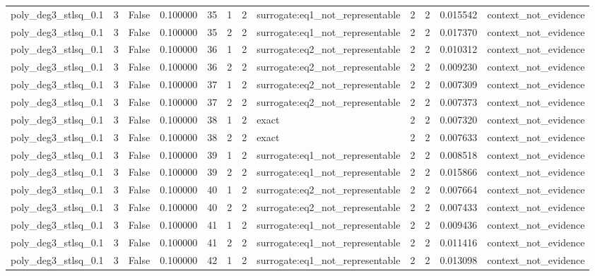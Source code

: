 \begin{tabular}{lrrrrrrlrrrl}
poly\_deg3\_stlsq\_0.1 & 3 & False & 0.100000 & 35 & 1 & 2 & surrogate:eq1\_not\_representable & 2 & 2 & 0.015542 & context\_not\_evidence \\
poly\_deg3\_stlsq\_0.1 & 3 & False & 0.100000 & 35 & 2 & 2 & surrogate:eq1\_not\_representable & 2 & 2 & 0.017370 & context\_not\_evidence \\
poly\_deg3\_stlsq\_0.1 & 3 & False & 0.100000 & 36 & 1 & 2 & surrogate:eq2\_not\_representable & 2 & 2 & 0.010312 & context\_not\_evidence \\
poly\_deg3\_stlsq\_0.1 & 3 & False & 0.100000 & 36 & 2 & 2 & surrogate:eq2\_not\_representable & 2 & 2 & 0.009230 & context\_not\_evidence \\
poly\_deg3\_stlsq\_0.1 & 3 & False & 0.100000 & 37 & 1 & 2 & surrogate:eq2\_not\_representable & 2 & 2 & 0.007309 & context\_not\_evidence \\
poly\_deg3\_stlsq\_0.1 & 3 & False & 0.100000 & 37 & 2 & 2 & surrogate:eq2\_not\_representable & 2 & 2 & 0.007373 & context\_not\_evidence \\
poly\_deg3\_stlsq\_0.1 & 3 & False & 0.100000 & 38 & 1 & 2 & exact & 2 & 2 & 0.007320 & context\_not\_evidence \\
poly\_deg3\_stlsq\_0.1 & 3 & False & 0.100000 & 38 & 2 & 2 & exact & 2 & 2 & 0.007633 & context\_not\_evidence \\
poly\_deg3\_stlsq\_0.1 & 3 & False & 0.100000 & 39 & 1 & 2 & surrogate:eq1\_not\_representable & 2 & 2 & 0.008518 & context\_not\_evidence \\
poly\_deg3\_stlsq\_0.1 & 3 & False & 0.100000 & 39 & 2 & 2 & surrogate:eq1\_not\_representable & 2 & 2 & 0.015866 & context\_not\_evidence \\
poly\_deg3\_stlsq\_0.1 & 3 & False & 0.100000 & 40 & 1 & 2 & surrogate:eq2\_not\_representable & 2 & 2 & 0.007664 & context\_not\_evidence \\
poly\_deg3\_stlsq\_0.1 & 3 & False & 0.100000 & 40 & 2 & 2 & surrogate:eq2\_not\_representable & 2 & 2 & 0.007433 & context\_not\_evidence \\
poly\_deg3\_stlsq\_0.1 & 3 & False & 0.100000 & 41 & 1 & 2 & surrogate:eq1\_not\_representable & 2 & 2 & 0.009436 & context\_not\_evidence \\
poly\_deg3\_stlsq\_0.1 & 3 & False & 0.100000 & 41 & 2 & 2 & surrogate:eq1\_not\_representable & 2 & 2 & 0.011416 & context\_not\_evidence \\
poly\_deg3\_stlsq\_0.1 & 3 & False & 0.100000 & 42 & 1 & 2 & surrogate:eq1\_not\_representable & 2 & 2 & 0.013098 & context\_not\_evidence \\

\end{tabular}
